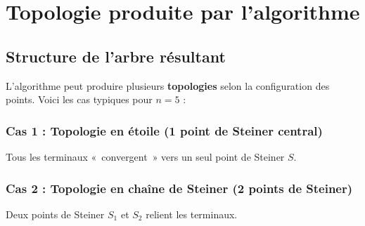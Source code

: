 \documentclass[12pt,a4paper]{article}
\begin{document}
\section{Topologie produite par l'algorithme}

\subsection{Structure de l'arbre résultant}

L'algorithme peut produire plusieurs \textbf{topologies} selon la configuration
des points. Voici les cas typiques pour $n = 5$ :

\subsubsection*{Cas 1 : Topologie en étoile (1 point de Steiner central)}

Tous les terminaux «~convergent~» vers un seul point de Steiner $S$.

\begin{center}
\end{center}

\subsubsection*{Cas 2 : Topologie en chaîne de Steiner (2 points de Steiner)}

Deux points de Steiner $S_1$ et $S_2$ relient les terminaux.
\end{document}
